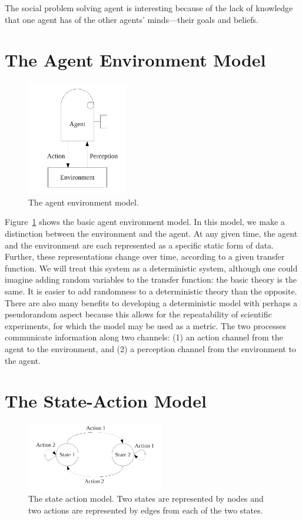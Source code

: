 The social problem solving agent is interesting because of the lack of
knowledge that one agent has of the other agents' minds---their goals
and beliefs.

\section{The Agent Environment Model}

\begin{figure}[bth]
  \center
  \includegraphics[height=5cm]{gfx/agent_environment}
  \caption[The agent environment model]{The agent environment model.}
  \label{fig:agent_environment}
\end{figure}

Figure~\ref{fig:agent_environment} shows the basic agent environment
model.  In this model, we make a distinction between the environment
and the agent.  At any given time, the agent and the environment are
each represented as a specific static form of data.  Further, these
representations change over time, according to a given transfer
function.  We will treat this system as a deterministic system,
although one could imagine adding random variables to the transfer
function: the basic theory is the same.  It is easier to add
randomness to a deterministic theory than the opposite.  There are
also many benefits to developing a deterministic model with perhaps a
pseudorandom aspect because this allows for the repeatability of
scientific experiments, for which the model may be used as a metric.
The two processes communicate information along two channels: (1) an
action channel from the agent to the environment, and (2) a perception
channel from the environment to the agent.


\section{The State-Action Model}

\begin{figure}[bth]
  \center
  \includegraphics[width=6cm]{gfx/state_action}
  \caption[The state-action model]{The state action model.  Two states
    are represented by nodes and two actions are represented by edges
    from each of the two states.}
  \label{fig:state_action}
\end{figure}

